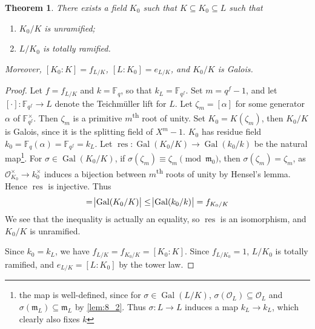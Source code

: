\documentclass[11pt]{article}
\theoremstyle{definition}
\theoremstyle{plain}
\newtheorem{theorem}[definition]{Theorem}
\theoremstyle{remark}
\DeclareMathOperator{\Gal}{Gal}
\DeclareMathOperator{\res}{res}
\newcommand{\FF}{\mathbb{F}}
\newcommand{\cO}{\mathcal{O}}
\newcommand{\fm}{\mathfrak{m}}
\begin{document}
\begin{theorem}\label{thm:13_3}
    There exists a field $K_0$ such that $K \subseteq K_0 \subseteq L$ such that
    \begin{enumerate}
        \item $K_0/K$ is unramified;
        \item $L/K_0$ is totally ramified.
    \end{enumerate}
    Moreover, $[K_0 : K] = f_{L/K}$, $[L : K_0] = e_{L/K}$, and $K_0 / K$ is Galois.
\end{theorem}
\begin{proof}
    Let $f = f_{L/K}$ and $k = \FF_q$, so that $k_L = \FF_{q^f}$. Set $m = q^f - 1$, and let $[\cdot] : \FF_{q^f} \to L$ denote the Teichm\"uller lift for $L$. Let $\zeta_m = [\alpha]$ for some generator $\alpha$ of $\FF_{q^f}^\times$. Then $\zeta_m$ is a primitive $m$\textsuperscript{th} root of unity. Set $K_0 = K(\zeta_m)$, then $K_0 / K$ is Galois, since it is the splitting field of $X^m - 1$. $K_0$ has residue field $k_0 = \FF_q(\alpha) = \FF_{q^f} = k_L$. Let $\res : \Gal(K_0 / K) \to \Gal(k_0 / k)$ be the natural map\footnote{the map is well-defined, since for $\sigma \in \Gal(L/K)$, $\sigma(\cO_L) \subseteq \cO_L$ and $\sigma(\fm_L) \subseteq \fm_L$ by \autoref{lem:8_2}. Thus $\sigma : L \to L$ induces a map $k_L \to k_L$, which clearly also fixes $k$}. For $\sigma \in \Gal(K_0 / K)$, if $\sigma(\zeta_m) \equiv \zeta_m \pmod{\fm_0}$, then $\sigma(\zeta_m) = \zeta_m$, as $\cO_{K_0}^\times \to k_0^\times$ induces a bijection between $m$\textsuperscript{th} roots of unity by Hensel's lemma. Hence $\res$ is injective. Thus
    \begin{equation*}
        [K_0 : K] = \abs{\Gal(K_0 / K)} \le \abs{\Gal(k_0 / k)} = f_{K_0 / K}
    \end{equation*}
    We see that the inequality is actually an equality, so $\res$ is an isomorphism, and $K_0 / K$ is unramified.

    Since $k_0 = k_L$, we have $f_{L/K} = f_{K_0/K} = [K_0 : K]$. Since $f_{L/K_0} = 1$, $L / K_0$ is totally ramified, and $e_{L/K} = [L : K_0]$ by the tower law.
\end{proof}
\end{document}
